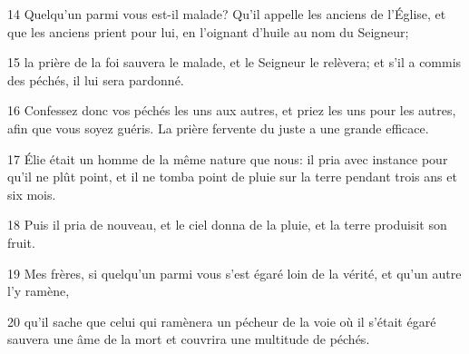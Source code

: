 \par 14 Quelqu'un parmi vous est-il malade? Qu'il appelle les anciens de l'Église, et que les anciens prient pour lui, en l'oignant d'huile au nom du Seigneur;
\par 15 la prière de la foi sauvera le malade, et le Seigneur le relèvera; et s'il a commis des péchés, il lui sera pardonné.
\par 16 Confessez donc vos péchés les uns aux autres, et priez les uns pour les autres, afin que vous soyez guéris. La prière fervente du juste a une grande efficace.
\par 17 Élie était un homme de la même nature que nous: il pria avec instance pour qu'il ne plût point, et il ne tomba point de pluie sur la terre pendant trois ans et six mois.
\par 18 Puis il pria de nouveau, et le ciel donna de la pluie, et la terre produisit son fruit.
\par 19 Mes frères, si quelqu'un parmi vous s'est égaré loin de la vérité, et qu'un autre l'y ramène,
\par 20 qu'il sache que celui qui ramènera un pécheur de la voie où il s'était égaré sauvera une âme de la mort et couvrira une multitude de péchés.


